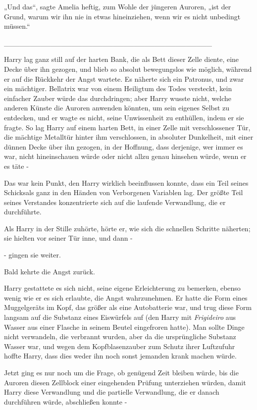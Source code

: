 {„Und das“, sagte Amelia heftig, zum Wohle der jüngeren Auroren, „ist der Grund, warum wir ihn nie in etwas hineinziehen, wenn wir es nicht unbedingt müssen.“

\_\_\_\_\_\_\_\_\_\_\_\_\_\_\_\_\_\_\_\_\_\_\_\_\_\_\_\_\_\_\_\_\_\_\_\_\_\_\_\_

Harry lag ganz still auf der harten Bank, die als Bett dieser Zelle diente, eine Decke über ihn gezogen, und blieb so absolut bewegungslos wie möglich, während er auf die Rückkehr der Angst wartete. Es näherte sich ein Patronus, und zwar ein mächtiger. Bellatrix war von einem Heiligtum des Todes versteckt, kein einfacher Zauber würde das durchdringen; aber Harry wusste nicht, welche anderen Künste die Auroren anwenden könnten, um sein eigenes Selbst zu entdecken, und er wagte es nicht, seine Unwissenheit zu enthüllen, indem er sie fragte. So lag Harry auf einem harten Bett, in einer Zelle mit verschlossener Tür, die mächtige Metalltür hinter ihm verschlossen, in absoluter Dunkelheit, mit einer dünnen Decke über ihn gezogen, in der Hoffnung, dass derjenige, wer immer es war, nicht hineinschauen würde oder nicht allzu genau hinsehen würde, wenn er es täte -

Das war kein Punkt, den Harry wirklich beeinflussen konnte, dass ein Teil seines Schicksals ganz in den Händen von Verborgenen Variablen lag. Der größte Teil seines Verstandes konzentrierte sich auf die laufende Verwandlung, die er durchführte.

Als Harry in der Stille zuhörte, hörte er, wie sich die schnellen Schritte näherten; sie hielten vor seiner Tür inne, und dann -

- gingen sie weiter.

Bald kehrte die Angst zurück.

Harry gestattete es sich nicht, seine eigene Erleichterung zu bemerken, ebenso wenig wie er es sich erlaubte, die Angst wahrzunehmen. Er hatte die Form eines Muggelgeräts im Kopf, das größer als eine Autobatterie war, und trug diese Form langsam auf die Substanz eines Eiswürfels auf (den Harry mit \emph{Frigideiro} aus Wasser aus einer Flasche in seinem Beutel eingefroren hatte). Man sollte Dinge nicht verwandeln, die verbrannt wurden, aber da die ursprüngliche Substanz Wasser war, und wegen dem Kopfblasenzauber zum Schutz ihrer Luftzufuhr hoffte Harry, dass dies weder ihn noch sonst jemanden krank machen würde.

Jetzt ging es nur noch um die Frage, ob genügend Zeit bleiben würde, bis die Auroren diesen Zellblock einer eingehenden Prüfung unterziehen würden, damit Harry diese Verwandlung und die partielle Verwandlung, die er danach durchführen würde, abschließen konnte -

}
